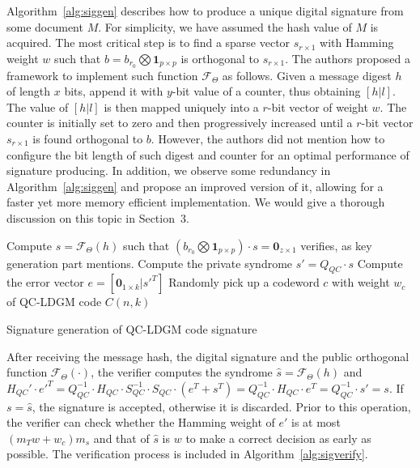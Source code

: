 \documentclass[10pt,journal,compsoc]{IEEEtran}
\begin{document}
Algorithm~\ref{alg:siggen} describes how to produce a unique digital signature from some document $M$. For simplicity, we have assumed the hash value of $M$ is acquired. The most critical step is to find a sparse vector $s_{r\times 1}$ with Hamming weight $w$ such that $b = b_{r_0}\bigotimes \textbf{1}_{p\times p}$ is orthogonal to $s_{r\times 1}$. The authors proposed a framework to implement such function $\mathcal{F}_\Theta$ as follows\cite{baldi2013using}. Given a message digest $h$ of length $x$ bits, append it with $y$-bit value of a counter, thus obtaining $[h|l]$. The value of $[h|l]$ is then mapped uniquely into a $r$-bit vector of weight $w$. The counter is initially set to zero and then progressively increased until a $r$-bit vector $s_{r\times 1}$ is found orthogonal to $b$. However, the authors did not mention how to configure the bit length of such digest and counter for an optimal performance of signature producing.  In addition, we observe some redundancy in Algorithm~\ref{alg:siggen} and propose an improved version of it, allowing for a faster yet more memory efficient implementation. We would give a thorough discussion on this topic in Section~3.

\begin{algorithm}[h]	
	\DontPrintSemicolon %
    Compute $s=\mathcal{F}_\Theta(h)$ such that $(b_{r_0}\bigotimes \textbf{1}_{p\times p})\cdot s = \textbf{0}_{z\times 1}$ verifies, as key generation part mentions.\;
	Compute the private syndrome $s' = Q_{QC}\cdot s$\;
    Compute the error vector $e=[\textbf{0}_{1\times k}|s'^T]$\;
    Randomly pick up a codeword $c$ with weight $w_c$ of QC-LDGM code $C(n,k)$\;
	\caption{Signature generation of QC-LDGM code signature}\label{alg:siggen}
\end{algorithm}


After receiving the message hash, the digital signature and the public orthogonal function $\mathcal{F}_\Theta(\cdot)$, the verifier
computes the syndrome $\hat{s}=\mathcal{F}_\Theta(h)$ and $H_{QC}'\cdot e'^T = Q_{QC}^{-1}\cdot H_{QC}\cdot S_{QC}^{-1}\cdot S_{QC}\cdot(e^T+s^T) = Q_{QC}^{-1}\cdot H_{QC}\cdot e^T = Q_{QC}^{-1}\cdot s' = s$. If $s=\hat{s}$, the signature is accepted, otherwise it is discarded. Prior to this operation, the verifier can check whether the Hamming weight of $e'$ is at most $(m_Tw+w_c)m_s$
and that of $\hat{s}$ is $w$ to make a correct decision as early as possible.  The verification process is included in Algorithm~{\ref{alg:sigverify}}.
\end{document}
